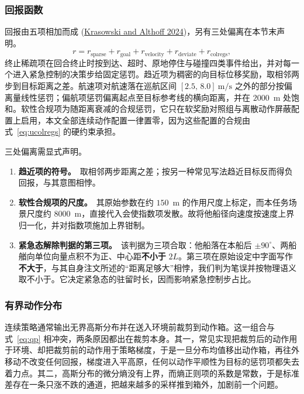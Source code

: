 \documentclass[12pt,letterpaper]{article}
\newcommand{\citl}[2]{(\hyperlink{ref:#1}{#2})}
\begin{document}
\subsubsection{回报函数}

回报由五项相加而成 \citl{krasowski2024}{Krasowski and Althoff 2024}，另有三处偏离在本节末声明。
\begin{equation}
 r=r_{\mathrm{sparse}}+r_{\mathrm{goal}}+r_{\mathrm{velocity}}+r_{\mathrm{deviate}}+r_{\mathrm{colregs}},
 \label{eq:reward}
\end{equation}
终止稀疏项在回合终止时按到达、超时、原地停住与碰撞四类事件给出，并对每一个进入紧急控制的决策步给固定惩罚。趋近项为稠密的向目标位移奖励，取相邻两步到目标距离之差。航速项对航速落在巡航区间 $[2.5,\,8.0]~\mathrm{m/s}$ 之外的部分按偏离量线性惩罚；偏航项惩罚偏离起点至目标参考线的横向距离，并在 $2000$~m 处饱和。软性合规项为随距离衰减的合规惩罚，它只在软奖励对照组与离散动作屏蔽配置上启用，本文全部连续动作配置一律置零，因为这些配置的合规由式~\eqref{eq:ucolregs} 的硬约束承担。

三处偏离需显式声明。
\begin{enumerate}\itemsep1pt\parskip0pt
 \item \textbf{趋近项的符号。}\ 取相邻两步距离之差；按另一种常见写法趋近目标反而得负回报，与其意图相悖。
 \item \textbf{软性合规项的尺度。}\ 其原始参数在约 $150$~m 的作用尺度上标定，而本任务场景尺度约 $8000$~m，直接代入会使指数项发散。故将他船径向速度按速度上界归一化，并对指数项施加上界钳制。
 \item \textbf{紧急态解除判据的第三项。}\ 该判据为三项合取：他船落在本船后 $\pm90^\circ$、两船艏向单位向量点积不为正、中心距\textbf{不小于} $2L$。第三项在原始设定中字面写作\textbf{不大于}，与其自身注文所述的“距离足够大”相悖，我们判为笔误并按物理语义取不小于。它决定紧急态的驻留时长，因而影响紧急控制步占比。
\end{enumerate}

\subsubsection{有界动作分布}

连续策略通常输出无界高斯分布并在送入环境前裁剪到动作箱。这一组合与式~\eqref{eq:qp} 相冲突，两条原因都出在裁剪本身。其一，常见实现把裁剪后的动作用于环境、却把裁剪前的动作用于策略梯度，于是一旦分布均值移出动作箱，再往外移动不改变任何回报，梯度进入平高原，任何以动作平顺性为目标的惩罚项都失去着力点。其二，高斯分布的微分熵没有上界，而熵正则项的系数是常数，于是标准差存在一条只涨不跌的通道，把越来越多的采样推到箱外，加剧前一个问题。
\end{document}

